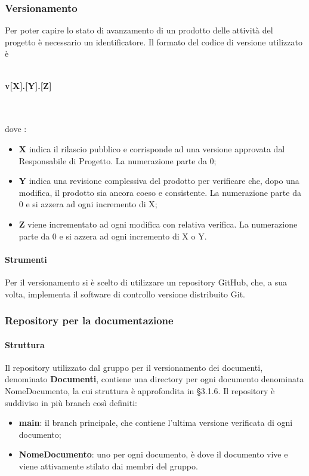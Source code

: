\subsubsection{Versionamento}
Per poter capire lo stato di avanzamento di un prodotto delle attività del progetto è necessario un identificatore. Il formato del codice di versione utilizzato è \\ \\
\centerline{\textbf{v[X].[Y].[Z]}} \\ \\
dove :
\begin{itemize}
\item \textbf{X} indica il rilascio pubblico e corrisponde ad una versione approvata dal Responsabile di Progetto. La numerazione parte da 0;
\item \textbf{Y} indica una revisione complessiva del prodotto per verificare che, dopo una modifica, il prodotto sia ancora coeso e consistente. La numerazione parte da 0 e si azzera ad ogni incremento di X;
\item \textbf{Z} viene incrementato ad ogni modifica con relativa verifica. La numerazione parte da 0 e si azzera ad ogni incremento di X o Y.
\end{itemize}

\paragraph{Strumenti}
Per il versionamento si è scelto di utilizzare un repository GitHub, che, a sua volta, implementa il software di controllo versione distribuito Git.

\subsubsection{Repository per la documentazione}
\paragraph{Struttura}
Il repository utilizzato dal gruppo per il versionamento dei documenti, denominato \textbf{Documenti}, contiene una directory per ogni documento denominata NomeDocumento, la cui struttura è approfondita in §3.1.6.
Il repository è suddiviso in più branch così definiti:
\begin{itemize}
\item \textbf{main}: il branch principale, che contiene l'ultima versione verificata di ogni documento;
\item \textbf{NomeDocumento}: uno per ogni documento, è dove il documento vive e viene attivamente stilato dai membri del gruppo.
\end{itemize}

